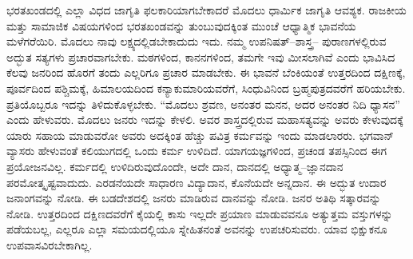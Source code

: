 ಭರತಖಂಡದಲ್ಲಿ ಎಲ್ಲಾ ವಿಧದ ಜಾಗೃತಿ ಫಲಕಾರಿಯಾಗಬೇಕಾದರೆ ಮೊದಲು ಧಾರ್ಮಿಕ ಜಾಗೃತಿ ಆವಶ್ಯಕ. ರಾಜಕೀಯ ಮತ್ತು ಸಾಮಾಜಿಕ ವಿಷಯಗಳಿಂದ ಭರತಖಂಡವನ್ನು ತುಂಬುವುದಕ್ಕಿಂತ ಮುಂಚೆ ಆಧ್ಯಾತ್ಮಿಕ ಭಾವನೆಯ ಮಳೆಗರೆಯಿರಿ. ಮೊದಲು ನಾವು ಲಕ್ಷ್ಯದಲ್ಲಿಡಬೇಕಾದುದು ಇದು. ನಮ್ಮ ಉಪನಿಷತ್​–ಶಾಸ್ತ್ರ– ಪುರಾಣಗಳಲ್ಲಿರುವ ಅದ್ಭುತ ಸತ್ಯಗಳು ಪ್ರಚಾರವಾಗಬೇಕು. ಮಠಗಳಿಂದ, ಕಾನನಗಳಿಂದ, ತಮಗೇ ಇವು ಮೀಸಲಾಗಿವೆ ಎಂದು ಭಾವಿಸಿದ ಕೆಲವು ಜನರಿಂದ ಹೊರಗೆ ತಂದು ಎಲ್ಲರಿಗೂ ಪ್ರಚಾರ ಮಾಡಬೇಕು. ಈ ಭಾವನೆ ಬೆಂಕಿಯಂತೆ ಉತ್ತರದಿಂದ ದಕ್ಷಿಣಕ್ಕೆ, ಪೂರ್ವದಿಂದ ಪಶ್ಚಿಮಕ್ಕೆ, ಹಿಮಾಲಯದಿಂದ ಕನ್ಯಾಕುಮಾರಿಯವರೆಗೆ, ಸಿಂಧುವಿನಿಂದ ಬ್ರಹ್ಮಪುತ್ರದವರೆಗೆ ಹರಿಯಬೇಕು. ಪ್ರತಿಯೊಬ್ಬರೂ ಇದನ್ನು ತಿಳಿದುಕೊಳ್ಳಬೇಕು. “ಮೊದಲು ಶ್ರವಣ, ಅನಂತರ ಮನನ, ಅದರ ಅನಂತರ ನಿದಿ ಧ್ಯಾಸನ” ಎಂದು ಹೇಳುವರು. ಮೊದಲು ಜನರು ಇದನ್ನು ಕೇಳಲಿ. ಅವರ ಶಾಸ್ತ್ರದಲ್ಲಿರುವ ಮಹಾಸತ್ಯವನ್ನು ಅವರು ಕೇಳುವುದಕ್ಕೆ ಯಾರು ಸಹಾಯ ಮಾಡುವರೋ ಅವರು ಅದಕ್ಕಿಂತ ಹೆಚ್ಚು ಪವಿತ್ರ ಕರ್ಮವನ್ನು ಇಂದು ಮಾಡಲಾರರು. ಭಗವಾನ್​ ವ್ಯಾಸರು ಹೇಳುವಂತೆ ಕಲಿಯುಗದಲ್ಲಿ ಒಂದು ಕರ್ಮ ಉಳಿದಿದೆ. ಯಾಗಯಜ್ಞಗಳಿಂದ, ಪ್ರಚಂಡ ತಪಸ್ಸಿನಿಂದ ಈಗ ಪ್ರಯೋಜನವಿಲ್ಲ. ಕರ್ಮದಲ್ಲಿ ಉಳಿದಿರುವುದೊಂದೇ, ಅದೇ ದಾನ, ದಾನದಲ್ಲಿ ಅಧ್ಯಾತ್ಮ–ಜ್ಞಾನದಾನ ಪರಮೋತ್ಕೃಷ್ಟವಾದುದು. ಎರಡನೆಯದೇ ಸಾಧಾರಣ ವಿದ್ಯಾದಾನ, ಕೊನೆಯದೇ ಅನ್ನದಾನ. ಈ ಅದ್ಭುತ ಉದಾರ ಜನಾಂಗವನ್ನು ನೋಡಿ. ಈ ಬಡದೇಶದಲ್ಲಿ ಜನರು ಮಾಡಿರುವ ದಾನವನ್ನು ನೋಡಿ. ಜನರ ಅತಿಥಿ ಸತ್ಕಾರವನ್ನು ನೋಡಿ. ಉತ್ತರದಿಂದ ದಕ್ಷಿಣದವರೆಗೆ ಕೈಯಲ್ಲಿ ಕಾಸು ಇಲ್ಲದೇ ಪ್ರಯಾಣ ಮಾಡುವವನೂ ಅತ್ಯುತ್ತಮ ವಸ್ತುಗಳನ್ನು ಪಡೆಯಬಲ್ಲ, ಎಲ್ಲರೂ ಎಲ್ಲಾ ಸಮಯದಲ್ಲಿಯೂ ಸ್ನೇಹಿತನಂತೆ ಅವನನ್ನು ಉಪಚರಿಸುವರು. ಯಾವ ಭಿಕ್ಷುಕನೂ ಉಪವಾಸವಿರಬೇಕಾಗಿಲ್ಲ.

